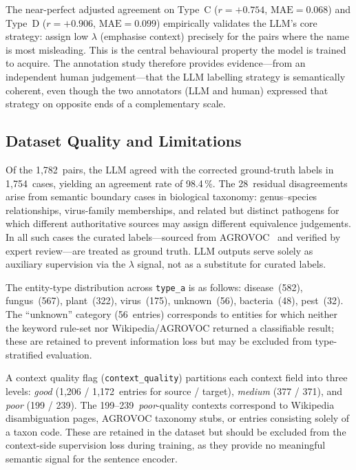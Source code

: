 The near-perfect adjusted agreement on Type~C ($r = +0.754$,
$\text{MAE} = 0.068$) and Type~D ($r = +0.906$, $\text{MAE} = 0.099$)
empirically validates the LLM's core strategy: assign low $\lambda$
(emphasise context) precisely for the pairs where the name is most
misleading. This is the central behavioural property the model is
trained to acquire. The annotation study therefore provides
evidence---from an independent human judgement---that the LLM
labelling strategy is semantically coherent, even though the two
annotators (LLM and human) expressed that strategy on opposite
ends of a complementary scale.

\subsection{Dataset Quality and Limitations}
\label{sec:quality}

Of the 1{,}782~pairs, the LLM agreed with the corrected ground-truth
labels in 1{,}754~cases, yielding an agreement rate of 98.4\,\%.
The 28~residual disagreements arise from semantic boundary cases in
biological taxonomy: genus--species relationships, virus-family
memberships, and related but distinct pathogens for which different
authoritative sources may assign different equivalence judgements.
In all such cases the curated labels---sourced from AGROVOC~\cite{agrovoc}
and verified by expert review---are treated as ground truth.
LLM outputs serve solely as auxiliary supervision via the $\lambda$
signal, not as a substitute for curated labels.

The entity-type distribution across \texttt{type\_a} is as follows:
disease~(582), fungus~(567), plant~(322), virus~(175), unknown~(56),
bacteria~(48), pest~(32). The ``unknown'' category (56~entries)
corresponds to entities for which neither the keyword rule-set nor
Wikipedia/AGROVOC returned a classifiable result; these are retained
to prevent information loss but may be excluded from type-stratified
evaluation.

A context quality flag (\texttt{context\_quality}) partitions each
context field into three levels: \emph{good} (1{,}206 / 1{,}172~entries
for source / target), \emph{medium} (377 / 371), and \emph{poor}
(199 / 239). The 199--239~\emph{poor}-quality contexts correspond
to Wikipedia disambiguation pages, AGROVOC taxonomy stubs, or entries
consisting solely of a taxon code. These are retained in the dataset
but should be excluded from the context-side supervision loss during
training, as they provide no meaningful semantic signal for the
sentence encoder.

